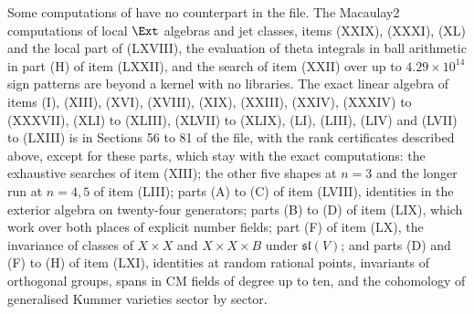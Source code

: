 Some computations of  have no counterpart in the
file. The Macaulay2 computations of local $\Ext$ algebras and jet classes,
items (XXIX), (XXXI), (XL) and the local part of (LXVIII), the evaluation of
theta integrals in ball arithmetic in part (H) of item (LXXII), and the
search of item (XXII) over up to $4.29\times10^{14}$ sign patterns are beyond
a kernel with no libraries. The exact linear algebra of items (I), (XIII),
(XVI), (XVIII), (XIX), (XXIII), (XXIV), (XXXIV) to (XXXVII), (XLI) to
(XLIII), (XLVII) to (XLIX), (LI), (LIII), (LIV) and (LVII) to (LXIII) is in
Sections 56 to 81 of the file, with the rank certificates described above,
except for these parts, which stay with the exact computations: the
exhaustive searches of item (XIII); the other five shapes at $n=3$ and the
longer run at $n=4,5$ of item (LIII); parts (A) to (C) of item (LVIII),
identities in the exterior algebra on twenty-four generators; parts (B) to
(D) of item (LIX), which work over both places of explicit number fields;
part (F) of item (LX), the invariance of classes of $X\times X$ and
$X\times X\times B$ under $\mathfrak{sl}(V)$; and parts (D) and (F) to (H)
of item (LXI), identities at random rational points, invariants of
orthogonal groups, spans in CM fields of degree up to ten, and the
cohomology of generalised Kummer varieties sector by sector.
